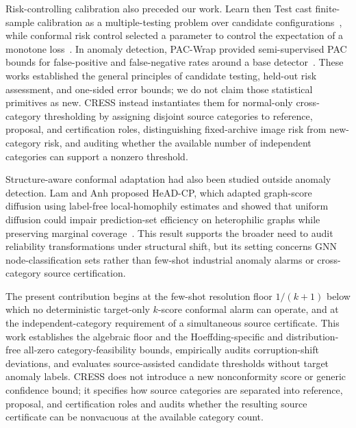 Risk-controlling calibration also preceded our work. Learn then Test cast finite-sample calibration as a multiple-testing problem over candidate configurations~\cite{angelopoulos2021learntest}, while conformal risk control selected a parameter to control the expectation of a monotone loss~\cite{angelopoulos2024crc}. In anomaly detection, PAC-Wrap provided semi-supervised PAC bounds for false-positive and false-negative rates around a base detector~\cite{li2022pacwrap}. These works established the general principles of candidate testing, held-out risk assessment, and one-sided error bounds; we do not claim those statistical primitives as new. CRESS instead instantiates them for normal-only cross-category thresholding by assigning disjoint source categories to reference, proposal, and certification roles, distinguishing fixed-archive image risk from new-category risk, and auditing whether the available number of independent categories can support a nonzero threshold.

Structure-aware conformal adaptation had also been studied outside anomaly detection. Lam and Anh proposed HeAD-CP, which adapted graph-score diffusion using label-free local-homophily estimates and showed that uniform diffusion could impair prediction-set efficiency on heterophilic graphs while preserving marginal coverage~\cite{lam2026headcp}. This result supports the broader need to audit reliability transformations under structural shift, but its setting concerns GNN node-classification sets rather than few-shot industrial anomaly alarms or cross-category source certification.

The present contribution begins at the few-shot resolution floor $1/(k{+}1)$ below which no deterministic target-only $k$-score conformal alarm can operate, and at the independent-category requirement of a simultaneous source certificate. This work establishes the algebraic floor and the Hoeffding-specific and distribution-free all-zero category-feasibility bounds, empirically audits corruption-shift deviations, and evaluates source-assisted candidate thresholds without target anomaly labels. CRESS does not introduce a new nonconformity score or generic confidence bound; it specifies how source categories are separated into reference, proposal, and certification roles and audits whether the resulting source certificate can be nonvacuous at the available category count.
